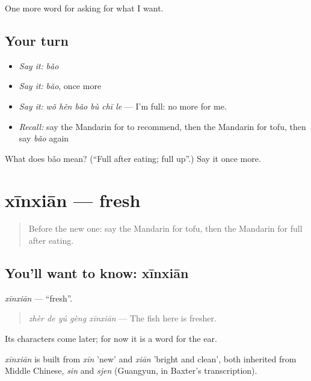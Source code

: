 \begin{grammarlens}[title={What you've built}]
One more word for asking for what I want.
\end{grammarlens}

\subsection*{Your turn}
\begin{itemize}
\raggedright
  \item \emph{Say it:} \emph{bǎo}
  \item \emph{Say it:} \emph{bǎo}, once more
  \item \emph{Say it:} \emph{wǒ hěn bǎo bù chī le} — I'm full: no more for me.
  \item \emph{Recall:} say the Mandarin for to recommend, then the Mandarin for tofu, then say \emph{bǎo} again
\end{itemize}

\begin{tcolorbox}[breakable,colback=teal!4,colframe=teal!35!black,title={Before you move on}]
What does bǎo mean? (\textquotedblleft{}Full after eating; full up\textquotedblright{}.) Say it once more.
\end{tcolorbox}
\section[xīnxiān]{xīnxiān — fresh}

\label{lesson:ZH-C177-xinxian}



\begin{quote}
Before the new one: say the Mandarin for tofu, then the Mandarin for full after eating.
\end{quote}

\subsection*{You'll want to know: xīnxiān}
\emph{xīnxiān} — \textquotedblleft{}fresh\textquotedblright{}.

\begin{quote}
\emph{zhèr de yú gèng xīnxiān} — The fish here is fresher.
\end{quote}

Its characters come later; for now it is a word for the ear.

\begin{cousinweb}
\emph{xīnxiān} is built from \emph{xīn} 'new' and \emph{xiān} 'bright and clean', both inherited from Middle Chinese, \emph{sin} and \emph{sjen} (Guangyun, in Baxter's transcription).
\end{cousinweb}

